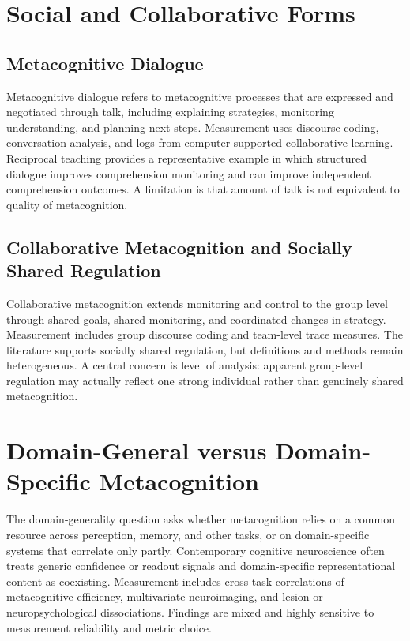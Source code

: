 \documentclass[a4paper]{article}
\begin{document}
   \section{Social and Collaborative Forms}

   \subsection{Metacognitive Dialogue}

   Metacognitive dialogue refers to metacognitive processes that are expressed and negotiated through talk, including explaining strategies, monitoring understanding, and planning next steps. Measurement uses discourse coding, conversation analysis, and logs from computer-supported collaborative learning. Reciprocal teaching provides a representative example in which structured dialogue improves comprehension monitoring and can improve independent comprehension outcomes. A limitation is that amount of talk is not equivalent to quality of metacognition.

   \subsection{Collaborative Metacognition and Socially Shared Regulation}

   Collaborative metacognition extends monitoring and control to the group level through shared goals, shared monitoring, and coordinated changes in strategy. Measurement includes group discourse coding and team-level trace measures. The literature supports socially shared regulation, but definitions and methods remain heterogeneous. A central concern is level of analysis: apparent group-level regulation may actually reflect one strong individual rather than genuinely shared metacognition.

   \section{Domain-General versus Domain-Specific Metacognition}

   The domain-generality question asks whether metacognition relies on a common resource across perception, memory, and other tasks, or on domain-specific systems that correlate only partly. Contemporary cognitive neuroscience often treats generic confidence or readout signals and domain-specific representational content as coexisting. Measurement includes cross-task correlations of metacognitive efficiency, multivariate neuroimaging, and lesion or neuropsychological dissociations. Findings are mixed and highly sensitive to measurement reliability and metric choice.
\end{document}
